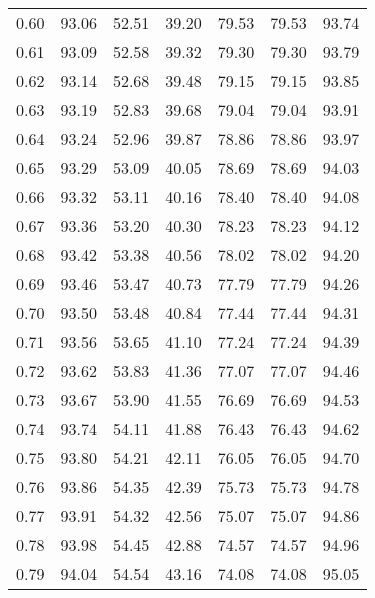 \begin{tabular}{|c|c|c|c|c|c|c|}
      0.60 &     93.06 &     52.51 &      39.20 &   79.53 &      79.53 &         93.74 \\
      0.61 &     93.09 &     52.58 &      39.32 &   79.30 &      79.30 &         93.79 \\
      0.62 &     93.14 &     52.68 &      39.48 &   79.15 &      79.15 &         93.85 \\
      0.63 &     93.19 &     52.83 &      39.68 &   79.04 &      79.04 &         93.91 \\
      0.64 &     93.24 &     52.96 &      39.87 &   78.86 &      78.86 &         93.97 \\
      0.65 &     93.29 &     53.09 &      40.05 &   78.69 &      78.69 &         94.03 \\
      0.66 &     93.32 &     53.11 &      40.16 &   78.40 &      78.40 &         94.08 \\
      0.67 &     93.36 &     53.20 &      40.30 &   78.23 &      78.23 &         94.12 \\
      0.68 &     93.42 &     53.38 &      40.56 &   78.02 &      78.02 &         94.20 \\
      0.69 &     93.46 &     53.47 &      40.73 &   77.79 &      77.79 &         94.26 \\
      0.70 &     93.50 &     53.48 &      40.84 &   77.44 &      77.44 &         94.31 \\
      0.71 &     93.56 &     53.65 &      41.10 &   77.24 &      77.24 &         94.39 \\
      0.72 &     93.62 &     53.83 &      41.36 &   77.07 &      77.07 &         94.46 \\
      0.73 &     93.67 &     53.90 &      41.55 &   76.69 &      76.69 &         94.53 \\
      0.74 &     93.74 &     54.11 &      41.88 &   76.43 &      76.43 &         94.62 \\
      0.75 &     93.80 &     54.21 &      42.11 &   76.05 &      76.05 &         94.70 \\
      0.76 &     93.86 &     54.35 &      42.39 &   75.73 &      75.73 &         94.78 \\
      0.77 &     93.91 &     54.32 &      42.56 &   75.07 &      75.07 &         94.86 \\
      0.78 &     93.98 &     54.45 &      42.88 &   74.57 &      74.57 &         94.96 \\
      0.79 &     94.04 &     54.54 &      43.16 &   74.08 &      74.08 &         95.05 \\

\end{tabular}
